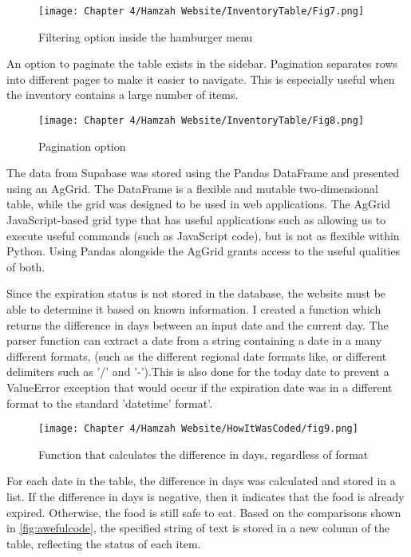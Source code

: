 \begin{figure}[H]        
    \centering
    \texttt{[image: Chapter 4/Hamzah Website/InventoryTable/Fig7.png]}
    \caption{Filtering option inside the hamburger menu}
\end{figure} 

An option to paginate the table exists in the sidebar.
Pagination separates rows into different pages to make it easier to navigate.
This is especially useful when the inventory contains a large number of items.

\begin{figure}[H]        
    \centering
    \texttt{[image: Chapter 4/Hamzah Website/InventoryTable/Fig8.png]}
    \caption{Pagination option}
\end{figure} 

The data from Supabase was stored using the Pandas DataFrame and presented using an AgGrid.
The DataFrame is a flexible and mutable two-dimensional table, while the grid was designed to be used in web applications.
The AgGrid JavaScript-based grid type that has useful applications such as allowing us to execute useful commands (such as JavaScript code), but is not as flexible within Python.
Using Pandas alongside the AgGrid grants access to the useful qualities of both.

Since the expiration status is not stored in the database, the website must be able to determine it based on known information.
I created a function which returns the difference in days between an input date and the current day.
The parser function can extract a date from a string containing a date in a many different formats, (such as the different regional date formats like, or different delimiters such as '/' and '-').This is also done for the today date to prevent a ValueError exception that would occur if the expiration date was in a different format to the standard 'datetime' format'.

\begin{figure}[H]        
    \centering
    \texttt{[image: Chapter 4/Hamzah Website/HowItWasCoded/fig9.png]}
    \caption{Function that calculates the difference in days, regardless of format}
\end{figure} 

For each date in the table, the difference in days was calculated and stored in a list.
If the difference in days is negative, then it indicates that the food is already expired.
Otherwise, the food is still safe to eat.
Based on the comparisons shown in \ref{fig:awefulcode}, the specified string of text is stored in a new column of the table, reflecting the status of each item.


